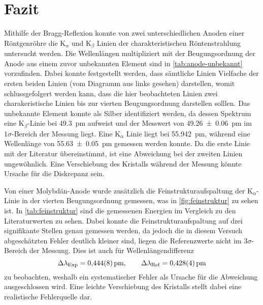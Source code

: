 \section{Fazit}\label{sec:fazit}
Mithilfe der Bragg-Reflexion konnte von zwei unterschiedlichen Anoden einer 
Röntgenröhre die K$_\alpha$ und K$_\beta$ Linien der charakteristischen 
Röntenstrahlung untersucht werden. Die Wellenlängen multipliziert mit der Beugungsordnung 
der Anode aus einem zuvor unbekannten Element sind in \cref{tab:anode-unbekannt}
vorzufinden. Dabei konnte festgestellt werden, dass sämtliche 
Linien Vielfache der ersten beiden Linien (vom Diagramm aus links gesehen)
darstellen, womit schlussgefolgert werden kann, dass die hier beobachteten Linien
zwei charakeristische Linien bis zur vierten Beugungsordnung darstellen solllen.
Das unbekannte Element konnte als Silber identifiziert werden, da 
dessen Spektrum eine K$_\beta$-Linie bei \SI{49.3}{\pm} aufweist und der 
Messwert von \SI{49.26\pm0.06}{\pm} im $1\sigma$-Bereich der Messung liegt. Eine K$_\alpha$ 
Linie liegt bei \SI{55.942}{\pm}, während eine Wellenlänge von \SI{55.63\pm0.05}{\pm}
gemessen werden konnte. Da die erste Linie mit der Literatur übereinstimmt, ist eine 
Abweichung bei der zweiten Linien ungewöhnlich. Eine Verschiebung 
des Kristalls während der Messung könnte Ursache für die Diskrepanz sein.\par 
Von einer Molybdän-Anode wurde zusätzlich die Feinstrukturaufspaltung 
der K$_\alpha$-Linie in der vierten Beugungsordnung gemessen, was in \cref{fig:feinstruktur}
zu sehen ist. In \cref{tab:feinstruktur} sind die gemessenen 
Energien im Vergleich zu den Literaturwerten zu sehen. Dabei konnte die Feinstrukturaufspaltung
auf drei signifikante Stellen genau gemessen werden, da jedoch die in diesem Versuch 
abgeschätzten Fehler deutlich kleiner sind, liegen die Referenzwerte nicht im $3\sigma$-Bereich
der Messung. Dies ist auch für Wellenlängendifferenz
\begin{equation*}
	\Delta\lambda_\mathrm{Exp} = \SI{0.444\pm 0.008}{\pm},\qquad
	\Delta\lambda_\mathrm{Ref} = \SI{0.428\pm0.004}{\pm}
\end{equation*}
zu beobachten, weshalb ein systematischer Fehler als Ursache für die Abweichung 
ausgeschlossen wird. Eine leichte Verschiebung des Kristalls stellt dabei 
eine realistische Fehlerquelle dar.\\\par

